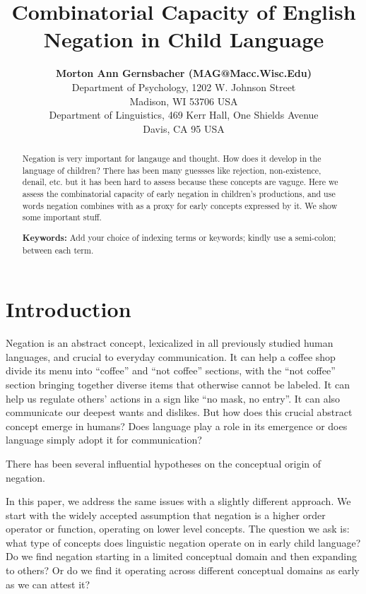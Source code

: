\documentclass[10pt, letterpaper]{article}
\title{Combinatorial Capacity of English Negation in Child Language}
\author{{\large \bf Morton Ann Gernsbacher (MAG@Macc.Wisc.Edu)} \\ Department of Psychology, 1202 W. Johnson Street \\ Madison, WI 53706 USA \AND {\large \bf Masoud Jasbi (jasbi@ucdavis.edu)} \\ Department of Linguistics, 469 Kerr Hall, One Shields Avenue \\ Davis, CA 95 USA}
\begin{document}
\maketitle

\begin{abstract}
Negation is very important for langauge and thought. How does it develop
in the language of children? There has been many guessses like
rejection, non-existence, denail, etc. but it has been hard to assess
because these concepts are vaguge. Here we assess the combinatorial
capacity of early negation in children's productions, and use words
negation combines with as a proxy for early concepts expressed by it. We
show some important stuff.

\textbf{Keywords:}
Add your choice of indexing terms or keywords; kindly use a semi-colon;
between each term.
\end{abstract}

\hypertarget{introduction}{%
\section{Introduction}\label{introduction}}

Negation is an abstract concept, lexicalized in all previously studied
human languages, and crucial to everyday communication. It can help a
coffee shop divide its menu into ``coffee'' and ``not coffee'' sections,
with the ``not coffee'' section bringing together diverse items that
otherwise cannot be labeled. It can help us regulate others' actions in
a sign like ``no mask, no entry''. It can also communicate our deepest
wants and dislikes. But how does this crucial abstract concept emerge in
humans? Does language play a role in its emergence or does language
simply adopt it for communication?

There has been several influential hypotheses on the conceptual origin
of negation.

In this paper, we address the same issues with a slightly different
approach. We start with the widely accepted assumption that negation is
a higher order operator or function, operating on lower level concepts.
The question we ask is: what type of concepts does linguistic negation
operate on in early child language? Do we find negation starting in a
limited conceptual domain and then expanding to others? Or do we find it
operating across different conceptual domains as early as we can attest
it?
\end{document}
